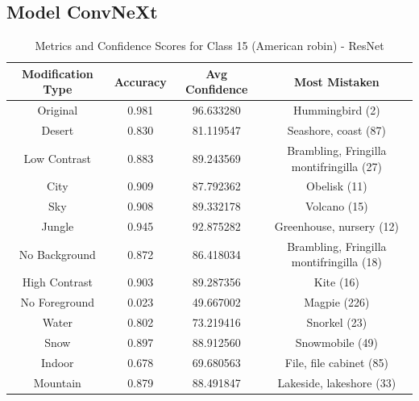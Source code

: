 \subsection*{Model ConvNeXt}


\begin{table}
	\centering
	\begin{tabular}{|c|c|c|c|}
		\hline
		\textbf{Modification Type} & \textbf{Accuracy} & \textbf{Avg Confidence} & \textbf{Most Mistaken} \\
		\hline
		Original & 0.981 & 96.633280 & Hummingbird (2) \\
		\hline
		Desert & 0.830 & 81.119547 & Seashore, coast (87) \\
		\hline
		Low Contrast & 0.883 & 89.243569 & Brambling, Fringilla montifringilla (27) \\
		\hline
		City & 0.909 & 87.792362 & Obelisk (11) \\
		\hline
		Sky & 0.908 & 89.332178 & Volcano (15) \\
		\hline
		Jungle & 0.945 & 92.875282 & Greenhouse, nursery (12) \\
		\hline
		No Background & 0.872 & 86.418034 & Brambling, Fringilla montifringilla (18) \\
		\hline
		High Contrast & 0.903 & 89.287356 & Kite (16) \\
		\hline
		No Foreground & 0.023 & 49.667002 & Magpie (226) \\
		\hline
		Water & 0.802 & 73.219416 & Snorkel (23) \\
		\hline
		Snow & 0.897 & 88.912560 & Snowmobile (49) \\
		\hline
		Indoor & 0.678 & 69.680563 & File, file cabinet (85) \\
		\hline
		Mountain & 0.879 & 88.491847 & Lakeside, lakeshore (33) \\
		\hline
	\end{tabular}
	\caption{Metrics and Confidence Scores for Class 15 (American robin) - ResNet}
	\label{tab:metrics_confidence_class_15_resnet}
\end{table}


